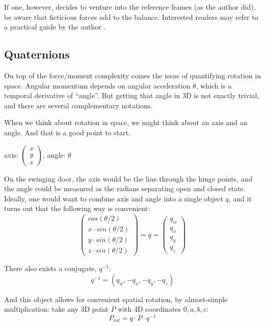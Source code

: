 \documentclass[10pt,a4paper]{article}
\begin{document}
If one, however, decides to venture into the reference frames (as the author did), be aware that ficticious forces add to the balance.
Interested readers may refer to a practical guide by the author \citep{Mielke2020wrenches}.


\subsection{Quaternions}
\label{sec:org78a39ad}
On top of the force/moment complexity comes the issue of quantifying rotation in space.
Angular momentum depends on angular acceleration \(\ddot\theta\), which is a temporal derivative of ``angle''.
But getting that angle in 3D is not exactly trivial, and there are several complementary notations.


When we think about rotation in space, we might think about an axis and an angle.
And that is a good point to start.

\begin{center}
axis: \(\begin{pmatrix}x\\y\\z \end{pmatrix}\), angle: \(\theta\)
\end{center}

On the swinging door, the axis would be the line through the hinge points, and the angle could be measured as the radians separating open and closed state.
Ideally, one would want to combine axis and angle into a single object \(q\), and it turns out that the following way is convenient:
\begin{equation}\label{eqn:quaternion}
\begin{pmatrix}cos(\theta/2)\\x\cdot sin(\theta/2)\\y\cdot sin(\theta/2)\\z\cdot sin(\theta/2) \end{pmatrix} = q = \begin{pmatrix}q_w\\q_x\\q_y\\q_z \end{pmatrix}
\end{equation}

There also exists a conjugate, \(q^{-1}\):
\[q^{-1} = (q_w, -q_x, -q_y, -q_z)\]


And this object allows for convenient spatial rotation, by almost-simple multiplication:
take any 3D point \(P\) with 4D coordinates \(0, a, b, c\):
\[P_{rot} = q\cdot P\cdot q^{-1}\]
\end{document}
